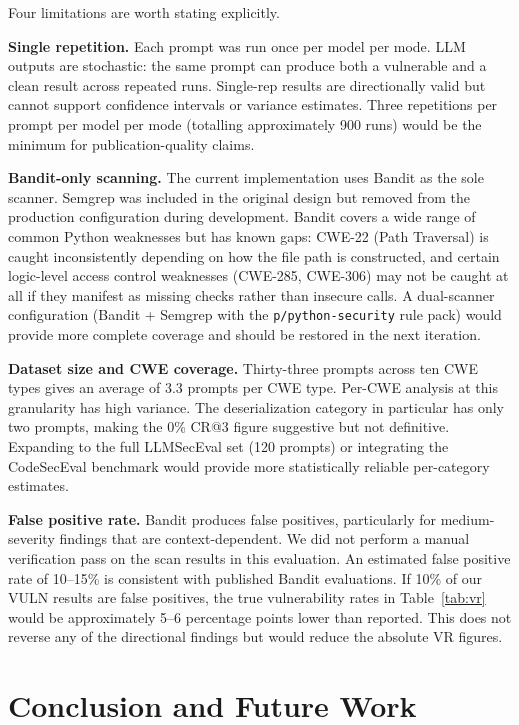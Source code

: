 \documentclass[12pt,a4paper]{report}
\begin{document}
Four limitations are worth stating explicitly.

\textbf{Single repetition.} Each prompt was run once per model per mode. LLM
outputs are stochastic: the same prompt can produce both a vulnerable and a clean
result across repeated runs. Single-rep results are directionally valid but
cannot support confidence intervals or variance estimates. Three repetitions per
prompt per model per mode (totalling approximately 900 runs) would be the minimum
for publication-quality claims.

\textbf{Bandit-only scanning.} The current implementation uses Bandit as the
sole scanner. Semgrep was included in the original design but removed from the
production configuration during development. Bandit covers a wide range of
common Python weaknesses but has known gaps: CWE-22 (Path Traversal) is caught
inconsistently depending on how the file path is constructed, and certain
logic-level access control weaknesses (CWE-285, CWE-306) may not be caught at
all if they manifest as missing checks rather than insecure calls. A dual-scanner
configuration (Bandit + Semgrep with the \texttt{p/python-security} rule pack)
would provide more complete coverage and should be restored in the next iteration.

\textbf{Dataset size and CWE coverage.} Thirty-three prompts across ten CWE types
gives an average of 3.3 prompts per CWE type. Per-CWE analysis at this granularity
has high variance. The deserialization category in particular has only two prompts,
making the 0\% CR@3 figure suggestive but not definitive. Expanding to the full
LLMSecEval set (120 prompts) or integrating the CodeSecEval benchmark would
provide more statistically reliable per-category estimates.

\textbf{False positive rate.} Bandit produces false positives, particularly for
medium-severity findings that are context-dependent. We did not perform a manual
verification pass on the scan results in this evaluation. An estimated false
positive rate of 10--15\% is consistent with published Bandit evaluations. If
10\% of our VULN results are false positives, the true vulnerability rates in
Table~\ref{tab:vr} would be approximately 5--6 percentage points lower than
reported. This does not reverse any of the directional findings but would reduce
the absolute VR figures.

\chapter{Conclusion and Future Work}
\label{ch:conclusion}
\end{document}
